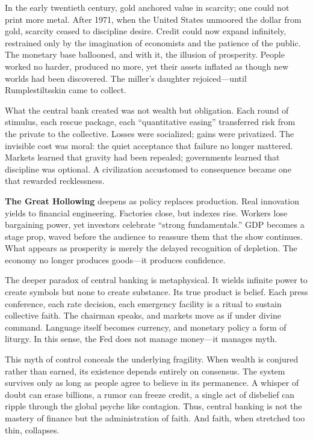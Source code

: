 \documentclass[11pt,twoside]{book}
\begin{document}
In the early twentieth century, gold anchored value in scarcity; one could not print more metal.  
After 1971, when the United States unmoored the dollar from gold, scarcity ceased to discipline desire.  
Credit could now expand infinitely, restrained only by the imagination of economists and the patience of the public.  
The monetary base ballooned, and with it, the illusion of prosperity.  
People worked no harder, produced no more, yet their assets inflated as though new worlds had been discovered.  
The miller’s daughter rejoiced—until Rumplestiltsskin came to collect.

What the central bank created was not wealth but obligation.  
Each round of stimulus, each rescue package, each “quantitative easing” transferred risk from the private to the collective.  
Losses were socialized; gains were privatized.  
The invisible cost was moral: the quiet acceptance that failure no longer mattered.  
Markets learned that gravity had been repealed; governments learned that discipline was optional.  
A civilization accustomed to consequence became one that rewarded recklessness.

\textbf{The Great Hollowing} deepens as policy replaces production.  
Real innovation yields to financial engineering.  
Factories close, but indexes rise.  
Workers lose bargaining power, yet investors celebrate “strong fundamentals.”  
GDP becomes a stage prop, waved before the audience to reassure them that the show continues.  
What appears as prosperity is merely the delayed recognition of depletion.  
The economy no longer produces goods—it produces confidence.

The deeper paradox of central banking is metaphysical.  
It wields infinite power to create symbols but none to create substance.  
Its true product is belief.  
Each press conference, each rate decision, each emergency facility is a ritual to sustain collective faith.  
The chairman speaks, and markets move as if under divine command.  
Language itself becomes currency, and monetary policy a form of liturgy.  
In this sense, the Fed does not manage money—it manages myth.

This myth of control conceals the underlying fragility.  
When wealth is conjured rather than earned, its existence depends entirely on consensus.  
The system survives only as long as people agree to believe in its permanence.  
A whisper of doubt can erase billions, a rumor can freeze credit, a single act of disbelief can ripple through the global psyche like contagion.  
Thus, central banking is not the mastery of finance but the administration of faith.  
And faith, when stretched too thin, collapses.
\end{document}
